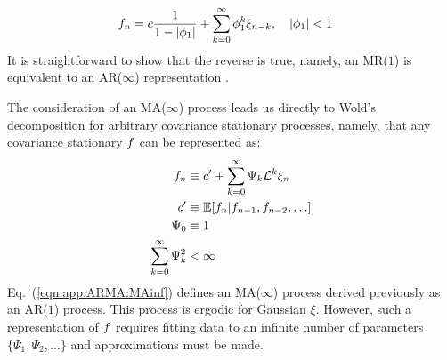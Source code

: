 \begin{align}
f_n &= c \frac{1}{1 - |\phi_1|}  +  \sum_{k=0}^{\infty} \phi_1^k \xi_{n-k}, \quad |\phi_1| < 1
\end{align}
It is straightforward to show that the reverse is true, namely, an MR($1$) is equivalent to an AR($\infty$) representation \cite{hamilton1994time}.

The consideration of an MA($\infty$) process leads us directly to Wold's decomposition for arbitrary covariance stationary processes, namely, that any covariance stationary $f$ can be represented as:
\begin{align}
f_n & \equiv  c' + \sum_{k=0}^{\infty} \Psi_k \mathcal{L}^k \xi_{n}  \label{eqn:app:ARMA:MAinf} \\
c' & \equiv \mathbb{E}[f_n | f_{n-1}, f_{n-2}, \hdots] \\
\Psi_0 & \equiv 1 \\
\sum_{k=0}^{\infty} \Psi_k^2 & < \infty
\end{align}
Eq.~(\ref {eqn:app:ARMA:MAinf}) defines an MA($\infty$) process derived previously as an AR($1$) process. This process is ergodic for Gaussian $\xi$. However, such a representation of $f$ requires fitting data to an infinite number of parameters $\{\Psi_1, \Psi_2, \hdots \}$  and approximations must be made. 


